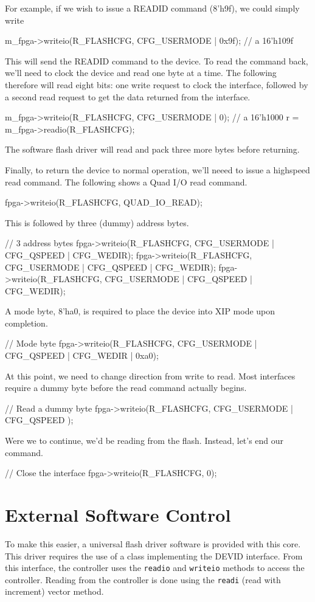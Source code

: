 \documentclass{gqtekspec}
\begin{document}
For example, if we wish to issue a READID command (8'h9f), we could simply
write

m_fpga->writeio(R\_FLASHCFG, CFG_USERMODE | 0x9f); // a 16'h109f

This will send the READID command to the device.  To read the command back,
we'll need to clock the device and read one byte at a time.  The following
therefore will read eight bits: one write request to clock the interface,
followed by a second read request to get the data returned from the interface.

m_fpga->writeio(R\_FLASHCFG, CFG_USERMODE | 0); // a 16'h1000
r = m_fpga->readio(R\_FLASHCFG);

The software flash driver will read and pack three more bytes before returning.

Finally, to return the device to normal operation, we'll neeed to issue a
highspeed read command.  The following shows a Quad I/O read command.

fpga->writeio(R_FLASHCFG, QUAD_IO_READ);

This is followed  by three (dummy) address bytes.

// 3 address bytes
fpga->writeio(R_FLASHCFG, CFG_USERMODE | CFG_QSPEED | CFG_WEDIR);
fpga->writeio(R_FLASHCFG, CFG_USERMODE | CFG_QSPEED | CFG_WEDIR);
fpga->writeio(R_FLASHCFG, CFG_USERMODE | CFG_QSPEED | CFG_WEDIR);

A mode byte, 8'ha0, is required to place the device into XIP mode upon
completion.

// Mode byte
fpga->writeio(R_FLASHCFG, CFG_USERMODE | CFG_QSPEED | CFG_WEDIR | 0xa0);

At this point, we need to change direction from write to read.
Most interfaces require a dummy byte before the read command actually begins.

// Read a dummy byte
fpga->writeio(R_FLASHCFG, CFG_USERMODE | CFG_QSPEED );

Were we to continue, we'd be reading from the flash.  Instead, let's end
our command.

// Close the interface
fpga->writeio(R_FLASHCFG, 0);

\section{External Software Control}

To make this easier, a universal flash driver software is provided with this
core.  This driver requires the use of a class implementing the DEVID
interface.  From this interface, the controller uses the {\tt readio}
and {\tt writeio} methods to access the controller.  Reading from the
controller is done using the {\tt readi} (read with increment) vector method.
\end{document}
